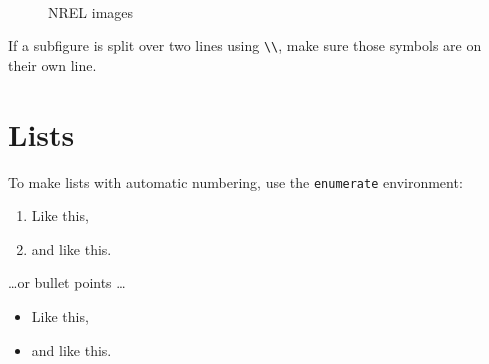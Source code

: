 \documentclass[12pt,letterpaper]{report}
\begin{document}
\begin{figure}[!h]
\centering
\hfill
{}
~ %
\hfill
{}
\hfill
\caption{NREL images}\label{fig:NRELimages}
\end{figure}

If a subfigure is split over two lines using \verb+\\+, make sure those symbols are on their own line.

\section{Lists}

To make lists with automatic numbering, use the \texttt{enumerate} environment:

\begin{enumerate}
\item Like this,
\item and like this.
\end{enumerate}
\dots or bullet points \dots
\begin{itemize}
\item Like this,
\item and like this.
\end{itemize}
\end{document}
